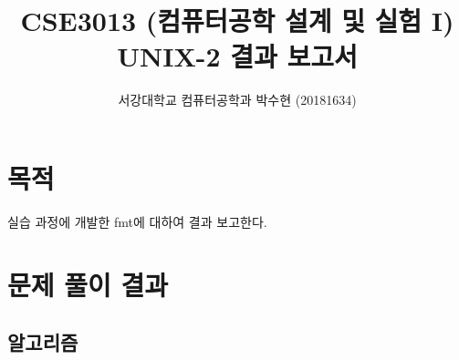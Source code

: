 \documentclass[runningheads]{../../../llncs}
\begin{document}
\title{CSE3013 (컴퓨터공학 설계 및 실험 I) \space \newline UNIX-2 결과 보고서}
\author{서강대학교 컴퓨터공학과 박수현 (20181634)}
\maketitle

\section{목적}
실습 과정에 개발한 fmt에 대하여 결과 보고한다.

\section{문제 풀이 결과}

\subsection{알고리즘}
\end{document}
